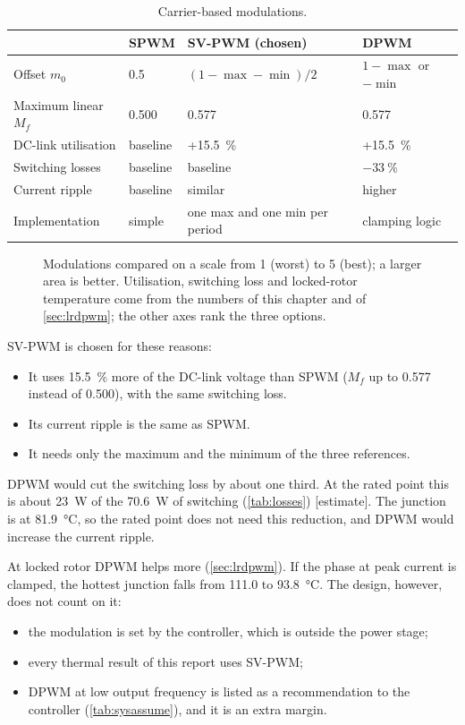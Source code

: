 \begin{table}[H]
\centering
\caption{Carrier-based modulations.}
\label{tab:modulation}
\small
\zebra
\begin{tabularx}{\textwidth}{lYYY}
\toprule
 & SPWM & SV-PWM (chosen) & DPWM \\
\midrule
Offset $m_0$ & 0.5 & $(1-\max-\min)/2$ & $1-\max$ or $-\min$ \\
Maximum linear $M_f$ & 0.500 & 0.577 & 0.577 \\
DC-link utilisation & baseline & +\SI{15.5}{\percent} & +\SI{15.5}{\percent} \\
Switching losses & baseline & baseline & $-\SI{33}{\percent}$ \\
Current ripple & baseline & similar & higher \\
Implementation & simple & one max and one min per period & clamping logic \\
\bottomrule
\end{tabularx}
\end{table}

\begin{figure}[H]
\centering

\caption{Modulations compared on a scale from 1 (worst) to 5 (best); a larger area is better.
Utilisation, switching loss and locked-rotor temperature come from the
numbers of this chapter and of \cref{sec:lrdpwm}; the other axes rank the
three options.}
\label{fig:radar-modulation}
\end{figure}

SV-PWM is chosen for these reasons:
\begin{itemize}
  \item It uses \SI{15.5}{\percent} more of the DC-link voltage than SPWM
        ($M_f$ up to 0.577 instead of 0.500), with the same switching loss.
  \item Its current ripple is the same as SPWM.
  \item It needs only the maximum and the minimum of the three references.
\end{itemize}

DPWM would cut the switching loss by about one third. At the rated point
this is about \SI{23}{\watt} of the \SI{70.6}{\watt} of switching
(\cref{tab:losses}) [estimate]. The junction is at \SI{81.9}{\celsius}, so
the rated point does not need this reduction, and DPWM would increase the
current ripple.

At locked rotor DPWM helps more (\cref{sec:lrdpwm}). If the phase at peak
current is clamped, the hottest junction falls from \SI{111.0}{} to
\SI{93.8}{\celsius}. The design, however, does not count on it:
\begin{itemize}
  \item the modulation is set by the controller, which is outside the
        power stage;
  \item every thermal result of this report uses SV-PWM;
  \item DPWM at low output frequency is listed as a recommendation to the
        controller (\cref{tab:sysassume}), and it is an extra margin.
\end{itemize}

